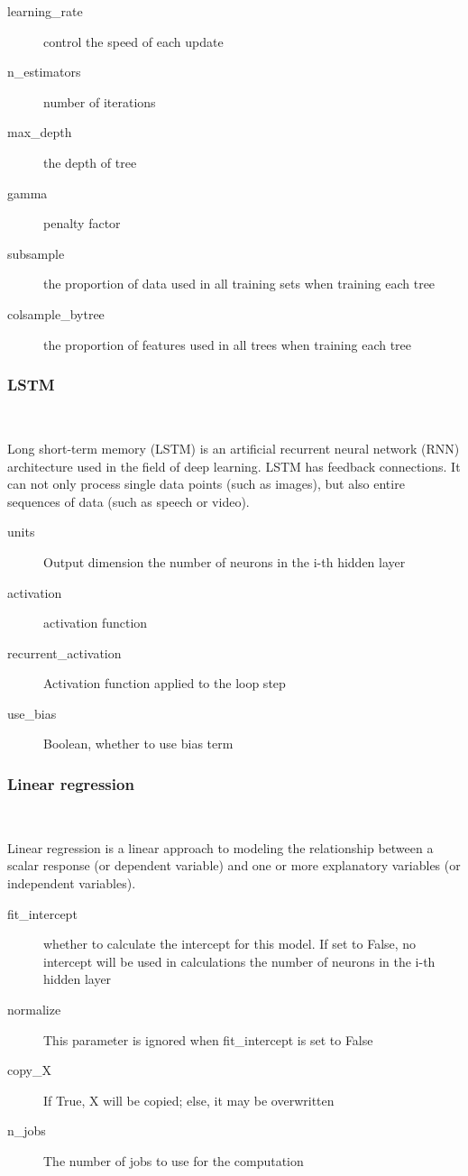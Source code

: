 \begin{description}
	\item[learning_rate]  control the speed of each update
	\item[n_estimators] number of iterations
	\item[max_depth] the depth of tree
	\item[gamma] penalty factor%
	\item[subsample] the proportion of data used in 
		all training sets when training each tree
	\item[colsample_bytree] the proportion of features used 
		in all trees when training each tree
	\end{description}

\subsubsection{LSTM}
\

Long short-term memory (LSTM) is an artificial 
recurrent neural network (RNN) 
architecture used in the field of 
deep learning. LSTM has feedback connections. 
It can not only process single data 
points (such as images), but also entire 
sequences of data (such as speech or video). 
	
	
\begin{description}
	\item[units] Output dimension 
		the number of neurons in the i-th hidden layer
	\item[activation] activation function
	\item[recurrent_activation] Activation function applied to the loop step
	\item[use_bias] Boolean, whether to use bias term
\end{description}

\subsubsection{Linear regression}
\

Linear regression is a linear approach to 
modeling the relationship between a scalar 
response (or dependent variable) and one 
or more explanatory variables (or 
independent variables). 


\begin{description}
	\item[fit_intercept] whether to calculate the intercept for this model. If 
	set to False, no intercept will be used in calculations 
	the number of neurons in the i-th hidden layer
	\item[normalize] This parameter is ignored when fit_intercept is set to 
	False
	\item[copy_X] If True, X will be copied; else, it may be overwritten
	\item[n_jobs] The number of jobs to use for the computation
\end{description}


